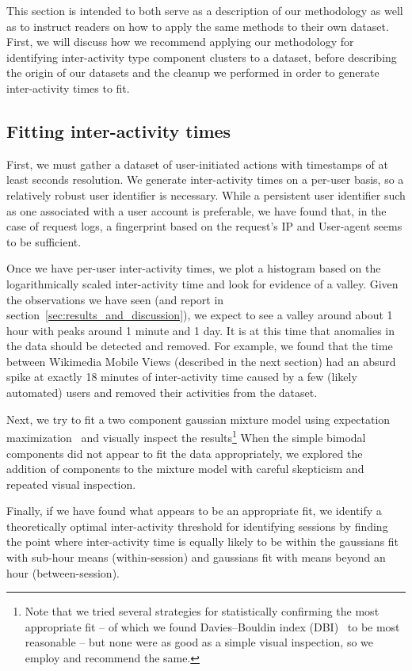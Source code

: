This section is intended to both serve as a description of our methodology as well as to instruct readers on how to apply the same methods to their own dataset.  First, we will discuss how we recommend applying our methodology for identifying inter-activity type component clusters to a dataset, before describing the origin of our datasets and the cleanup we performed in order to generate inter-activity times to fit.

\subsection{Fitting inter-activity times}
First, we must gather a dataset of user-initiated actions with timestamps of at least seconds resolution.  We generate inter-activity times on a per-user basis, so a relatively robust user identifier is necessary.  While a persistent user identifier such as one associated with a user account is preferable, we have found that, in the case of request logs, a fingerprint based on the request's IP and User-agent seems to be sufficient.

Once we have per-user inter-activity times, we plot a histogram based on the logarithmically scaled inter-activity time and look for evidence of a valley.  Given the observations we have seen (and report in section~\ref{sec:results_and_discussion}), we expect to see a valley around about 1 hour with peaks around 1 minute and 1 day.  It is at this time that anomalies in the data should be detected and removed.  For example, we found that the time between Wikimedia Mobile Views (described in the next section) had an absurd spike at exactly 18 minutes of inter-activity time caused by a few (likely automated) users and removed their activities from the dataset.

Next, we try to fit a two component gaussian mixture model using expectation maximization~\cite{benaglia2009mixtools} and visually inspect the results\footnote{Note that we tried several strategies for statistically confirming the most appropriate fit -- of which we found Davies--Bouldin index (DBI)~\cite{davies1979cluster} to be most reasonable -- but none were as good as a simple visual inspection, so we employ and recommend the same.}  When the simple bimodal components did not appear to fit the data appropriately, we explored the addition of components to the mixture model with careful skepticism and repeated visual inspection.

Finally, if we have found what appears to be an appropriate fit, we identify a theoretically optimal inter-activity threshold for identifying sessions by finding the point where inter-activity time is equally likely to be within the gaussians fit with sub-hour means (within-session) and gaussians fit with means beyond an hour (between-session).

